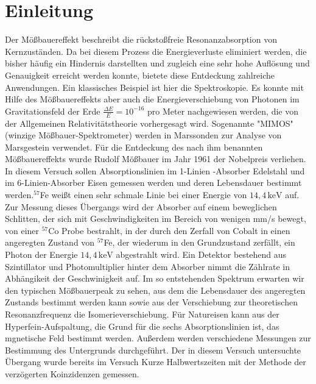 \section{Einleitung}
	
Der Mößbauereffekt beschreibt die rückstoßfreie Resonanzabsorption von Kernzuständen. Da bei diesem Prozess die Energieverluste eliminiert werden, die bisher häufig ein Hindernis darstellten und zugleich eine sehr hohe Auflösung und Genauigkeit erreicht werden konnte, bietete diese Entdeckung zahlreiche Anwendungen. Ein klassisches Beispiel ist hier die Spektroskopie. Es konnte mit Hilfe des Mößbauereffekts aber auch die Energieverschiebung von Photonen im Gravitationsfeld der Erde $\frac{\Delta E }{E} = 10^{-16} $ pro Meter nachgewiesen werden, die von der Allgemeinen Relativitätstheorie vorhergesagt wird. Sogenannte "MIMOS" (winzige Mößbauer-Spektrometer) werden in Marssonden zur Analyse von Marsgestein verwendet.
Für die Entdeckung des nach ihm benannten Mößbauereffekts wurde Rudolf Mößbauer im Jahr 1961 der Nobelpreis verliehen.\\

In diesem Versuch sollen Absorptionslinien im 1-Linien -Absorber Edelstahl und im 6-Linien-Absorber Eisen gemessen werden und deren Lebensdauer bestimmt werden.$^{57}$Fe weißt einen sehr schmale Linie bei einer Energie von $14,4\,\mathrm{keV}$ auf.
Zur Messung dieses Übergangs wird der Absorber auf einem beweglichen Schlitten, der sich mit Geschwindigkeiten im Bereich von wenigen mm/s bewegt, von einer $^{57}$Co Probe bestrahlt, in der durch den Zerfall von Cobalt in einen angeregten Zustand von $^{57}$Fe, der wiederum in den Grundzustand zerfällt, ein Photon der Energie $14,4\,\mathrm{keV}$ abgestrahlt wird. Ein Detektor bestehend aus Szintillator und Photomultiplier hinter dem Absorber nimmt die Zählrate in Abhängikeit der Geschwinigkeit auf. Im so entstehenden Spektrum erwarten wir den typischen Mößbauerpeak zu sehen, aus dem die Lebensdauer des angeregten Zustands bestimmt werden kann sowie aus der Verschiebung zur theoretischen Resonanzfrequenz die Isomerieverschiebung. Für Natureisen kann aus der Hyperfein-Aufspaltung, die Grund für die sechs Absorptionslinien ist, das mgnetische Feld bestimmt werden. Außerdem werden verschiedene Messungen zur Bestimmung des Untergrunds durchgeführt.
Der in diesem Versuch untersuchte Übergang wurde bereits im Versuch Kurze Halbwertszeiten mit der Methode der verzögerten Koinzidenzen gemessen. 


